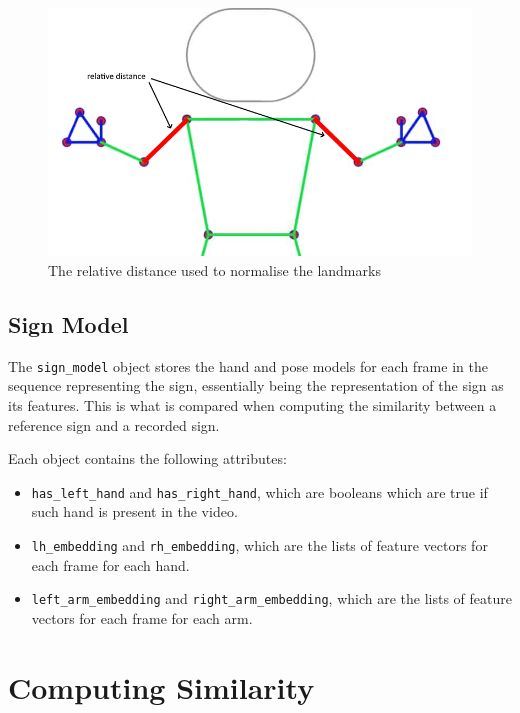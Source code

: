 \documentclass[final,dissertation.tex]{subfiles}
\begin{document}
\begin{figure}
    \begin{center}
        \includegraphics[width=\textwidth]{images/pose.png}
        \caption{The relative distance used to normalise the landmarks}
    \end{center}
\end{figure}

\subsection*{Sign Model}

The \verb|sign_model| object stores the hand and pose models for each frame in the sequence representing the sign, essentially being the representation of the sign as its features. This is what is compared when computing the similarity between a reference sign and a recorded sign.

Each object contains the following attributes:

\begin{itemize}
    \item \verb|has_left_hand| and \verb|has_right_hand|, which are booleans which are true if such hand is present in the video.
    \item \verb|lh_embedding| and \verb|rh_embedding|, which are the lists of feature vectors for each frame for each hand.
    \item \verb|left_arm_embedding| and \verb|right_arm_embedding|, which are the lists of feature vectors for each frame for each arm.
\end{itemize}

\section{Computing Similarity}
\end{document}
